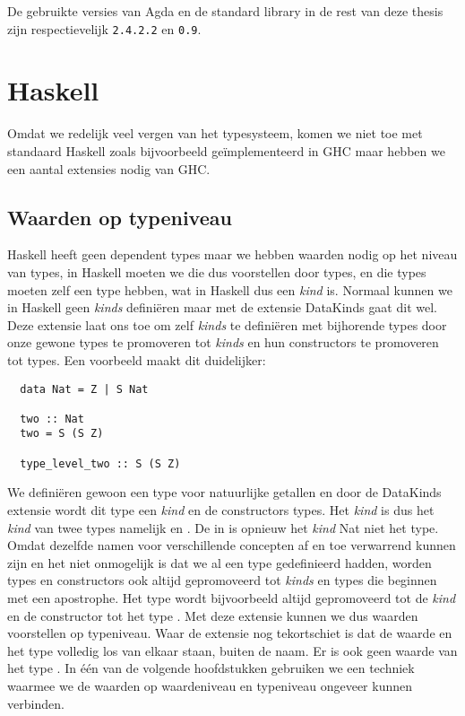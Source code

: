 De gebruikte versies van Agda en de standard library in de rest van deze thesis
zijn respectievelijk \texttt{2.4.2.2} en \texttt{0.9}.


\section{Haskell}

Omdat we redelijk veel vergen van het typesysteem, komen we niet toe met
standaard Haskell zoals bijvoorbeeld geïmplementeerd in GHC maar hebben we een
aantal extensies nodig van GHC.

\subsection{Waarden op typeniveau}

Haskell heeft geen dependent types maar we hebben waarden nodig op het niveau
van types, in Haskell moeten we die dus voorstellen door types, en die types
moeten zelf een type hebben, wat in Haskell dus een \emph{kind} is. Normaal
kunnen we in Haskell geen \emph{kinds} definiëren maar met de extensie
DataKinds \cite{datakinds} gaat dit wel.  Deze extensie laat ons toe om zelf
\emph{kinds} te definiëren met bijhorende types door onze gewone types te
promoveren tot \emph{kinds} en hun constructors te promoveren tot types. Een
voorbeeld maakt dit duidelijker:

\begin{verbatim}
  data Nat = Z | S Nat

  two :: Nat
  two = S (S Z)

  type_level_two :: S (S Z)
\end{verbatim}

We definiëren gewoon een type voor natuurlijke getallen en door de DataKinds
extensie wordt dit type een \emph{kind} en de constructors types. Het
\emph{kind}  is dus het \emph{kind} van twee types namelijk
 en . De  in  is opnieuw het
\emph{kind} Nat niet het type. Omdat dezelfde namen voor verschillende
concepten af en toe verwarrend kunnen zijn en het niet onmogelijk is dat we al
een type  gedefinieerd hadden, worden types en constructors ook altijd
gepromoveerd tot \emph{kinds} en types die beginnen met een apostrophe. Het
type  wordt bijvoorbeeld altijd gepromoveerd tot de \emph{kind}
 en de constructor  tot het type .  Met deze
extensie kunnen we dus waarden voorstellen op typeniveau. Waar de extensie nog
tekortschiet is dat de waarde  en het type  volledig los van
elkaar staan, buiten de naam. Er is ook geen waarde van het type . In
één van de volgende hoofdstukken gebruiken we een techniek waarmee we de
waarden op waardeniveau en typeniveau ongeveer kunnen verbinden.


